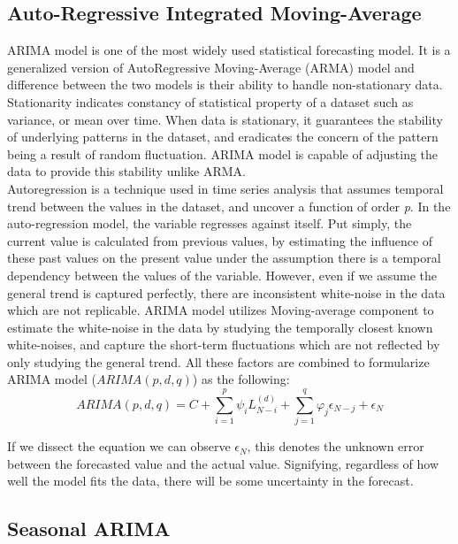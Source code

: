 \documentclass[]{usiinfbachelorproject}
\begin{document}
\subsection{Auto-Regressive Integrated Moving-Average}
ARIMA model is one of the most widely used statistical forecasting model. It is a generalized version of AutoRegressive Moving-Average (ARMA) model and difference between the two models is their ability to handle non-stationary data. Stationarity indicates constancy of statistical property of a dataset such as variance, or mean over time. When data is stationary, it guarantees the stability of underlying patterns in the dataset, and eradicates the concern of the pattern being a result of random fluctuation. ARIMA model is capable of adjusting the data to provide this stability unlike ARMA. \\

Autoregression is a technique used in time series analysis that assumes temporal trend between the values in the dataset, and uncover a function of order \textit{p}. In the auto-regression model, the variable regresses against itself. Put simply, the current value is calculated from previous values, by estimating the influence of these past values on the present value under the assumption there is a temporal dependency between the values of the variable. However, even if we assume the general trend is captured perfectly, there are inconsistent white-noise in the data which are not replicable. ARIMA model utilizes Moving-average component to estimate the white-noise in the data by studying the temporally closest known white-noises, and capture the short-term fluctuations which are not reflected by only studying the general trend. All these factors are combined to formularize ARIMA model (${ARIMA(p, d, q)}$) as the following: \\

\begin{equation}
    ARIMA(p,d,q) = C + \sum_{i=1}^{p} \psi_i L_{N - i}^{(d)} + \sum_{j=1}^{q}\varphi_j\epsilon_{N-j} + \epsilon_{N}
\end{equation}

If we dissect the equation we can observe ${\epsilon_N}$, this denotes the unknown error between the forecasted value and the actual value. Signifying, regardless of how well the model fits the data, there will be some uncertainty in the forecast.

\subsection {Seasonal ARIMA}
\end{document}
